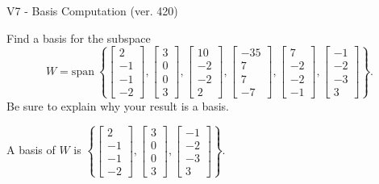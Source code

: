 \begin{exercise}
  \begin{exerciseTitle}V7 - Basis Computation (ver. 420)\end{exerciseTitle}
  \begin{exerciseStatement}
    Find a basis for the subspace 
\[W=\mathrm{span}\ \left\{\left[\begin{array}{r}
2 \\
-1 \\
-1 \\
-2
\end{array}\right] , \left[\begin{array}{r}
3 \\
0 \\
0 \\
3
\end{array}\right] , \left[\begin{array}{r}
10 \\
-2 \\
-2 \\
2
\end{array}\right] , \left[\begin{array}{r}
-35 \\
7 \\
7 \\
-7
\end{array}\right] , \left[\begin{array}{r}
7 \\
-2 \\
-2 \\
-1
\end{array}\right] , \left[\begin{array}{r}
-1 \\
-2 \\
-3 \\
3
\end{array}\right]\right\}.\]
 Be sure to explain why your result is a basis.


  \end{exerciseStatement}
  \begin{exerciseAnswer}
   A basis of \(W\) is  \(\left\{\left[\begin{array}{r}
2 \\
-1 \\
-1 \\
-2
\end{array}\right] , \left[\begin{array}{r}
3 \\
0 \\
0 \\
3
\end{array}\right] , \left[\begin{array}{r}
-1 \\
-2 \\
-3 \\
3
\end{array}\right]\right\}\).
  


  \end{exerciseAnswer}
\end{exercise}
